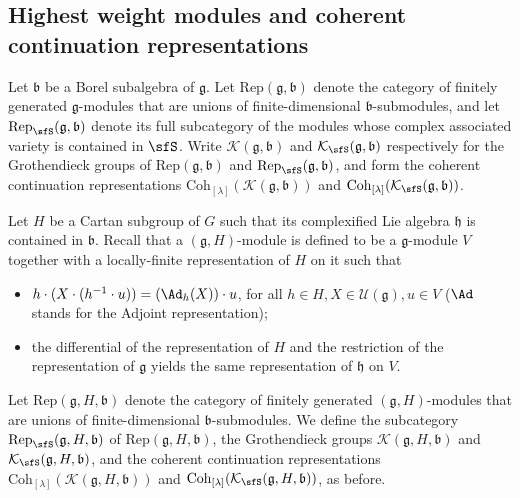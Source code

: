 \documentclass[12pt,a4paper]{amsart}
\newcommand{\CK}{{\mathcal {K}}}
\newcommand{\CU}{{\mathcal {U}}}
\newcommand{\g}{\mathfrak g}
\newcommand{\h}{\mathfrak h}
\renewcommand{\b}{\mathfrak b}
\numberwithin{equation}{section}
\theoremstyle{remark}
\def\Coh{\mathrm{Coh}}
\newcommand{\Lam}{{[\lambda]}}
\begin{document}

\subsection{Highest weight modules and coherent continuation representations}

\newcommand{\Rep}{\mathrm{Rep}}
Let $\b$ be a  Borel subalgebra of $\g$. Let $\Rep(\g,\b)$ denote the category of finitely generated $\g$-modules that are unions of finite-dimensional $\b$-submodules, and  let $\Rep_\sfS(\g,\b)$ denote its full subcategory of the modules whose complex associated variety is contained in $\sfS$.
Write $\CK(\g,\b)$ and $\CK_\sfS(\g,\b)$ respectively for the Grothendieck groups of $\Rep(\g,\b)$  and $\Rep_\sfS(\g,\b)$, and form the   coherent continuation representations $\Coh_{\Lam}(\CK(\g,\b))$ and $\Coh_{\Lam}(\CK_\sfS(\g,\b))$.


    Let $H$ be a Cartan subgroup of $G$ such that its complexified Lie algebra $\h$ is contained in $\b$. Recall that a $(\g, H)$-module is defined to be a $\g$-module $V$ together with a locally-finite representation of $H$ on it such that
     \begin{itemize}
     \item
        $h\cdot (X\cdot (h^{-1}\cdot u))=(\Ad_h(X))\cdot u$, for all $h\in H, X\in \CU(\g), u\in V$ ($\Ad$ stands for the Adjoint representation);
        \item the differential of the representation of $H$ and the restriction of the representation of $\g$ yields the same representation of $\h$ on $V$.
     \end{itemize}

Let $\Rep(\g,H,\b)$ denote the category of finitely generated $(\g, H)$-modules that  are unions of finite-dimensional $\b$-submodules.
We define the subcategory $\Rep_\sfS(\g,H,\b)$ of $\Rep(\g,H,\b)$,  the Grothendieck groups $\CK(\g,H, \b)$ and $\CK_\sfS(\g,H, \b)$, and the coherent continuation representations $\Coh_{\Lam}(\CK(\g,H, \b))$ and  $\Coh_{\Lam}(\CK_\sfS(\g,H, \b))$, as before.
\end{document}
